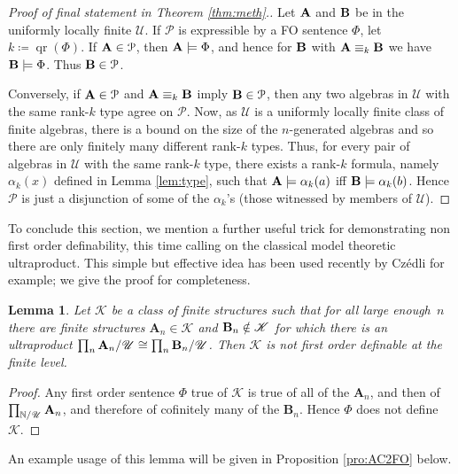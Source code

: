\documentclass[reqno]{amsart}
\theoremstyle{plain}
\newtheorem{lem}[thm]{Lemma}
\theoremstyle{definition}
\newcommand{\qr}{\operatorname{qr}}
\begin{document}
\begin{proof}[Proof of final statement in Theorem \ref{thm:meth}.]
Let ${\bf A}$ and ${\bf B}$ be in the uniformly locally finite $\mathscr{U}$.
If $\mathcal{P}$ is expressible by a FO sentence $\Phi$, let $k\coloneqq \qr(\Phi)$. If ${\bf A}\in\mathcal{P}$, then ${\bf A}\models\Phi$, and hence for ${\bf B}$ with ${\bf A}\equiv_k{\bf B}$ we have ${\bf B}\models\Phi$. Thus ${\bf B}\in\mathcal{P}$.

Conversely, if ${\bf A}\in\mathcal{P}$ and ${\bf A}\equiv_k{\bf B}$ imply ${\bf B}\in\mathcal{P}$, then any two algebras in $\mathscr{U}$ with the same rank-$k$ type agree on $\mathcal{P}$. Now, as $\mathscr{U}$ is a uniformly locally finite class of finite algebras, there is a bound on the size of the $n$-generated algebras and so there are only finitely many different rank-$k$ types. Thus, for every pair of algebras in $\mathscr{U}$ with the same rank-$k$ type, there exists a rank-$k$ formula, namely $\alpha_k(x)$ defined in Lemma \ref{lem:type}, such that ${\bf A}\models \alpha_{k}(a)$ iff ${\bf B}\models \alpha_{k}(b)$. Hence $\mathcal{P}$ is just a disjunction of some of the $\alpha_{k}$'s (those witnessed by members of $\mathscr{U}$).
\end{proof}

To conclude this section, we mention a further useful trick for demonstrating non first order definability, this time calling on the classical model theoretic ultraproduct.  This simple but effective idea has been used recently by Cz\'edli \cite[\S2]{cze} for example; we give the proof for completeness.
\begin{lem}\label{lem:czedli}
Let $\mathscr{K}$ be a class of finite structures such that for all large enough~$n$ there are finite structures $\mathbf{A}_n\in \mathscr{K}$ and ${\bf B}_n\notin\mathscr{K}$ for which there is an ultraproduct $\prod_{n}{\bf A}_n/\mathscr{U}\cong \prod_{n}{\bf B}_n/\mathscr{U}$.  Then $\mathscr{K}$ is not first order definable at the finite level.
\end{lem}
\begin{proof}
Any first order sentence $\Phi$ true of $\mathscr{K}$ is true of all of the $\mathbf{A}_n$, and then of $\prod_{\mathbb{N}/\mathscr{U}}{\bf A}_n$, and therefore of cofinitely many of the $\mathbf{B}_n$.  Hence $\Phi$ does not define~$\mathscr{K}$.
\end{proof}
An example usage of this lemma will be given in Proposition \ref{pro:AC2FO} below.
\end{document}
